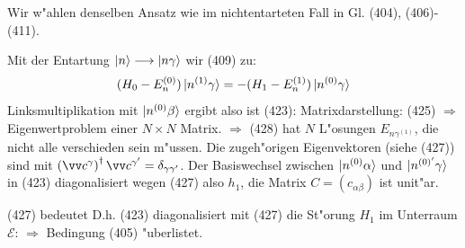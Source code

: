 \documentclass[a4paper]{scrartcl}
\begin{document}
Wir w"ahlen denselben Ansatz wie im nichtentarteten Fall in Gl. (404), (406)-(411).

Mit der Entartung $\ket n \longrightarrow \ket{ n \gamma}$ wir (409) zu:
$$(H_0 - E_n^{(0)}) \ket{ n^{(1)} \gamma} = - (H_1 - E_n^{(1)}) \ket{n ^{(0)} \gamma}$$
Linksmultiplikation mit $\ket{n^{(0)} \beta}$ ergibt
also ist (423):
Matrixdarstellung:
(425) $\Longrightarrow$
Eigenwertproblem einer $N \times N$ Matrix.
$\Longrightarrow$
(428) hat $N$ L"osungen $E_{n\gamma^{(1)}}$, die nicht alle verschieden sein m"ussen. Die zugeh"origen Eigenvektoren (siehe (427)) sind
mit $\left( \vv c^\gamma \right)^\dagger \vv c^{\gamma'} = \delta_{\gamma \gamma'}$. Der Basiswechsel zwischen $\ket{ n^{(0)} \alpha}$ und $\ket{ n^{(0)'} \gamma}$ in (423) diagonalisiert wegen (427) also $h_1$, die Matrix $C=(c_{\alpha \beta})$ ist unit"ar.

(427) bedeutet
D.h. (423) diagonalisiert mit (427) die St"orung $H_1$ im Unterraum $\mathcal E$:
$\Longrightarrow$ Bedingung (405) "uberlistet.
\end{document}
